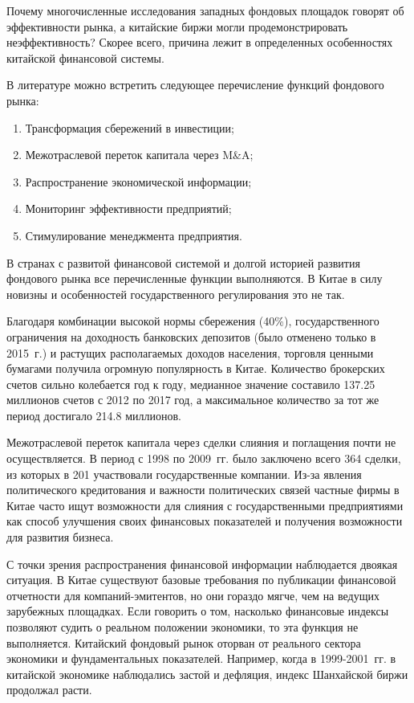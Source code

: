 \documentclass[a4paper,12pt]{article}
\begin{document}
Почему многочисленные исследования западных фондовых площадок говорят об эффективности рынка, а китайские биржи могли продемонстрировать неэффективность? Скорее всего, причина лежит в определенных особенностях китайской финансовой системы.

В литературе можно встретить следующее перечисление функций фондового рынка:
\begin{enumerate}
  \item Трансформация сбережений в инвестиции;
  \item Межотраслевой переток капитала через M\&A;
  \item Распространение экономической информации;
  \item Мониторинг эффективности предприятий;
  \item Стимулирование менеджмента предприятия.
\end{enumerate}

В странах с развитой финансовой системой и долгой историей развития фондового рынка все перечисленные функции выполняются. В Китае в силу новизны и особенностей государственного регулирования это не так.

Благодаря комбинации высокой нормы сбережения (40\%), государственного ограничения на доходность банковских депозитов (было отменено только в 2015~г.) и растущих располагаемых доходов населения, торговля ценными бумагами получила огромную популярность в Китае. Количество брокерских счетов сильно колебается год к году, медианное значение составило 137.25 миллионов счетов с 2012 по 2017 год, а максимальное количество за тот же период достигало 214.8 миллионов.

Межотраслевой переток капитала через сделки слияния и поглащения почти не осуществляется. В период с 1998 по 2009~гг. было заключено всего 364 сделки, из которых в 201 участвовали государственные компании. Из-за явления политического кредитования и важности политических связей частные фирмы в Китае часто ищут возможности для слияния с государственными предприятиями как способ улучшения своих финансовых показателей и получения возможности для развития бизнеса.

С точки зрения распространения финансовой информации наблюдается двоякая ситуация. В Китае существуют базовые требования по публикации финансовой отчетности для компаний-эмитентов, но они гораздо мягче, чем на ведущих зарубежных площадках. Если говорить о том, насколько финансовые индексы позволяют судить о реальном положении экономики, то эта функция не выполняется. Китайский фондовый рынок оторван от реального сектора экономики и фундаментальных показателей. Например, когда в 1999-2001~гг. в китайской экономике наблюдались застой и дефляция, индекс Шанхайской биржи продолжал расти.
\end{document}
